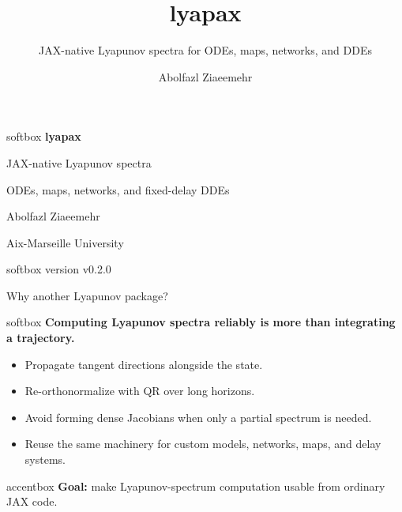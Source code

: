 \documentclass[aspectratio=169]{beamer}
\title{lyapax}
\subtitle{JAX-native Lyapunov spectra for ODEs, maps, networks, and DDEs}
\author{Abolfazl Ziaeemehr}
\date{}
\newcommand{\softbox}[1]{%
  \begin{beamercolorbox}[rounded=true,wd=\linewidth,sep=0.18cm]{softbox}
    #1
  \end{beamercolorbox}
}
\newcommand{\accentbox}[1]{%
  \begin{beamercolorbox}[rounded=true,wd=\linewidth,sep=0.20cm]{accentbox}
    #1
  \end{beamercolorbox}
}
\newcommand{\lyapaxversion}{v0.2.0}
\begin{document}
\begin{frame}[plain]
\vspace{0.75cm}
\begin{beamercolorbox}[rounded=true,wd=\linewidth,sep=0.45cm]{softbox}
{\Huge\textcolor{lyapaxpurple}{\textbf{lyapax}}}

\vspace{0.28cm}
{\Large JAX-native Lyapunov spectra}

\vspace{0.2cm}
{\large ODEs, maps, networks, and fixed-delay DDEs}
\end{beamercolorbox}

\vspace{0.55cm}

\vfill
{\normalsize Abolfazl Ziaeemehr}

\vspace{0.08cm}
{\small Aix-Marseille University}

\vspace{0.18cm}
\begin{beamercolorbox}[rounded=true,wd=0.24\linewidth,sep=0.09cm,center]{softbox}
{\scriptsize version \lyapaxversion}
\end{beamercolorbox}
\end{frame}

\begin{frame}{Why another Lyapunov package?}
\softbox{\textbf{Computing Lyapunov spectra reliably is more than integrating a trajectory.}}

\vspace{0.35cm}

\begin{itemize}
  \item Propagate tangent directions alongside the state.
  \item Re-orthonormalize with QR over long horizons.
  \item Avoid forming dense Jacobians when only a partial spectrum is needed.
  \item Reuse the same machinery for custom models, networks, maps, and delay systems.
\end{itemize}

\vspace{0.25cm}
\accentbox{\textbf{Goal:} make Lyapunov-spectrum computation usable from ordinary JAX code.}
\end{frame}
\end{document}
